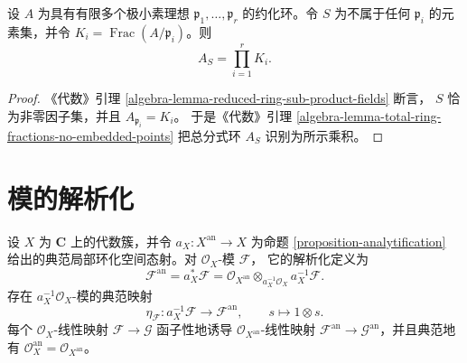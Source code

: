 \begin{lemma}
\label{lemma-total-fractions-reduced}
设 $A$ 为具有有限多个极小素理想
$\mathfrak p_1,\ldots,\mathfrak p_r$ 的约化环。令 $S$ 为不属于任何
$\mathfrak p_i$ 的元素集，并令 $K_i=\operatorname{Frac}(A/\mathfrak p_i)$。则
$$
A_S=\prod_{i=1}^rK_i.
$$
\end{lemma}

\begin{proof}
《代数》引理 \ref{algebra-lemma-reduced-ring-sub-product-fields} 断言，
$S$ 恰为非零因子集，并且 $A_{\mathfrak p_i}=K_i$。
于是《代数》引理 \ref{algebra-lemma-total-ring-fractions-no-embedded-points}
把总分式环 $A_S$ 识别为所示乘积。
\end{proof}



\section{模的解析化}
\label{section-analytification-modules}

\begin{definition}
\label{definition-analytification-module}
\begin{reference}
\cite[\S 3，第 9 号，定义 2]{GAGA}
\end{reference}
设 $X$ 为 $\mathbf C$ 上的代数簇，并令
$a_X:X^{\mathrm{an}}\to X$ 为命题 \ref{proposition-analytification}
给出的典范局部环化空间态射。对 $\mathcal O_X$-模 $\mathcal F$，
它的{解析化}定义为
$$
\mathcal F^{\mathrm{an}}=a_X^*\mathcal F
=\mathcal O_{X^{\mathrm{an}}}
\otimes_{a_X^{-1}\mathcal O_X}a_X^{-1}\mathcal F.
$$
存在 $a_X^{-1}\mathcal O_X$-模的典范映射
$$
\eta_{\mathcal F}:a_X^{-1}\mathcal F\longrightarrow
\mathcal F^{\mathrm{an}},\qquad s\longmapsto1\otimes s.
$$
每个 $\mathcal O_X$-线性映射 $\mathcal F\to\mathcal G$ 函子性地诱导
$\mathcal O_{X^{\mathrm{an}}}$-线性映射
$\mathcal F^{\mathrm{an}}\to\mathcal G^{\mathrm{an}}$，并且典范地有
$\mathcal O_X^{\mathrm{an}}=\mathcal O_{X^{\mathrm{an}}}$。
\end{definition}

